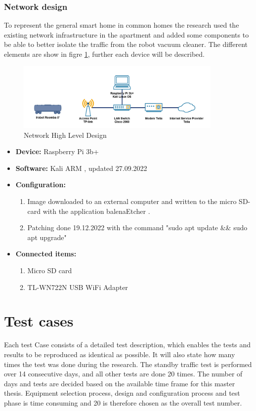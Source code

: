 \subsubsection{Network design}
To represent the general smart home in common homes the research used the existing network infrastructure in the apartment and added some components to be able to better isolate the traffic from the robot vacuum cleaner. The different elements are show in figre \ref{fig:HLD}, further each device will be described. 

\begin{figure}[!ht]
    \centering
    \includegraphics[width=10cm]{figures/HLD.png}
    \caption{Network High Level Design}
    \label{fig:HLD}
\end{figure}

\begin{itemize}
    \item \textbf{Device:} Raspberry Pi 3b+
    \item \textbf{Software:} Kali ARM \cite{kalidownload}, updated 27.09.2022
    \item \textbf{Configuration:}
    \begin{enumerate}
        \item Image downloaded to an external computer and written to the micro SD-card with the application balenaEtcher \cite{balenaetcherdownload}.
        \item Patching done 19.12.2022 with the command "sudo apt update \&\& sudo apt upgrade"
    \end{enumerate}
    \item \textbf{Connected items:}
    \begin{enumerate}
        \item Micro SD card \cite{microsdcard}
        \item TL-WN722N USB WiFi Adapter \cite{tp-link}
    \end{enumerate}
\end{itemize}

\section{Test cases}
Each test Case consists of a detailed test description, which enables the tests and results to be reproduced as identical as possible. It will also state how many times the test was done during the research. The standby traffic test is performed over 14 consecutive days, and all other tests are done 20 times. The number of days and tests are decided based on the available time frame for this master thesis. Equipment selection process, design and configuration process and test phase is time consuming and 20 is therefore chosen as the overall test number. 


